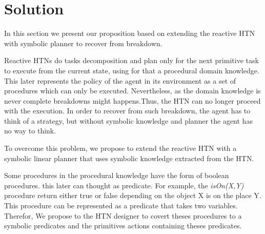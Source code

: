 \documentclass[conference]{IEEEtran}
\begin{document}
		\section{Solution }
		
		In this section we present our proposition based on extending the reactive HTN with symbolic planner to recover from breakdown.
		\par Reactive HTNs do tasks decomposition and plan only for the next primitive task to execute from the current state, using  for that a procedural domain knowledge. This later represents the policy of the agent in its environment as a set of procedures which can only be executed. Nevertheless, as the domain knowledge is never complete breakdowns might happens.Thus, the HTN can no longer proceed with the execution. In order to recover from such breakdown, the agent has to think of a strategy, but without symbolic knowledge and planner the agent has no way to think. 
		\par To overcome this problem, we propose to extend the reactive HTN with a symbolic linear planner that uses  symbolic knowledge extracted from the HTN. 
		
		\par Some procedures in the procedural knowledge have the form of boolean procedures. this later can thought as predicate. For example, the  
		\emph{isOn(X,Y)} procedure return either true or false depending on the object X  is on the place Y. This procedure can be represented as a predicate that takes two variables. Therefor, We propose to the HTN designer to covert theses procedures  to a symbolic predicates and the primitives actions containing theses predicates. 
		
\end{document}
